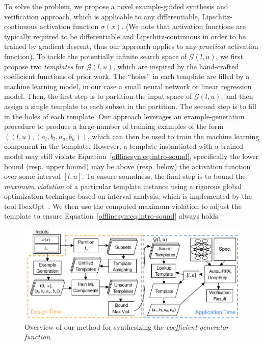 To solve the problem, we propose a novel example-guided synthesis and
verification approach, which is applicable to any differentiable,
Lipschitz-continuous activation function $ \sigma(x) $. (We note that
activation functions are typically required to be differentiable and
Lipschitz-continuous in order to be trained by gradient descent, thus our
approach applies to any \textit{practical} activation function).
%
To tackle the potentially infinite search space of $ \mathcal{G}(l, u) $, we
first propose two \textit{templates} for $ \mathcal{G}(l, u) $, which are
inspired by the hand-crafted coefficient functions of prior work.
%
The ``holes'' in each template are filled by a machine learning model, in our
case a small neural network or linear regression model.
%
Then, the first step is to partition the input space of $ \mathcal{G}(l,
u) $, and then assign a single template to each subset in the partition.
%
The second step is to fill in the holes of each template. Our approach
leverages an example-generation procedure to produce a large number of training
examples of the form $((l, u), (a_l, b_l, a_u, b_u)) $, which can then be used
to train the machine learning component in the template.
%
However, a template instantiated with a trained model may still violate
Equation~\ref{offlinesyn:eq:intro-sound}, specifically the lower bound (resp.
upper bound) may be above (resp. below) the activation function over some
interval $ [l, u] $.
%
To ensure soundness, the final step is to bound the
\textit{maximum violation} of a particular template instance using a rigorous
global optimization technique based on interval analysis, which is implemented
by the tool IbexOpt~\cite{chabert2009contractor}.
%
We then use the computed maximum violation to adjust the template to ensure
Equation~\ref{offlinesyn:eq:intro-sound} always holds.

\begin{figure}[t]
\centering
\includegraphics[width=.95\linewidth]{offlinesyn/figs/flow.pdf}
\caption{Overview of our method for synthesizing the \emph{coefficient generator
function}.}
\label{offlinesyn:fig:overview}
\end{figure}


